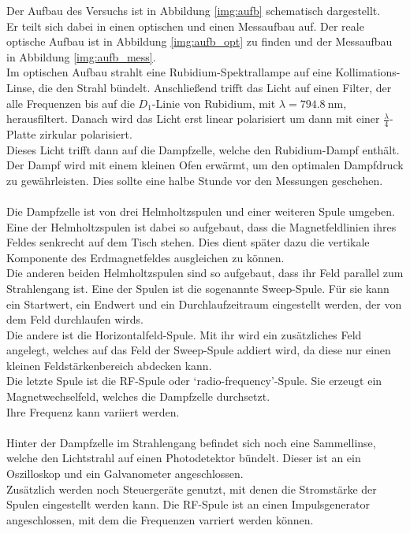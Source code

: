 \noindent
Der Aufbau des Versuchs ist in Abbildung \ref{img:aufb} schematisch dargestellt.\\
Er teilt sich dabei in einen optischen und einen Messaufbau auf. Der reale optische Aufbau ist in Abbildung
\ref{img:aufb_opt} zu finden und der Messaufbau in Abbildung \ref{img:aufb_mess}.\\
Im optischen Aufbau strahlt eine Rubidium-Spektrallampe auf eine Kollimations-Linse, die den Strahl bündelt.
Anschließend trifft das Licht auf einen Filter, der alle Frequenzen bis auf die $D_1$-Linie von Rubidium, 
mit $\lambda = \SI{794.8}{\nano\metre}$, herausfiltert. Danach wird das Licht erst linear polarisiert um dann mit einer $\frac{\lambda}{4}$-Platte zirkular polarisiert.\\
Dieses Licht trifft dann auf die Dampfzelle, welche den Rubidium-Dampf enthält. 
Der Dampf wird mit einem kleinen Ofen erwärmt, um den optimalen Dampfdruck zu gewährleisten.
Dies sollte eine halbe Stunde vor den Messungen geschehen.\\\\
Die Dampfzelle ist von drei Helmholtzspulen und einer weiteren Spule umgeben.\\
Eine der Helmholtzspulen ist dabei so aufgebaut, dass die Magnetfeldlinien ihres Feldes senkrecht auf dem Tisch stehen.
Dies dient später dazu die vertikale Komponente des Erdmagnetfeldes ausgleichen zu können.\\
Die anderen beiden Helmholtzspulen sind so aufgebaut, dass ihr Feld parallel zum Strahlengang ist.
Eine der Spulen ist die sogenannte Sweep-Spule. 
Für sie kann ein Startwert, ein Endwert und ein Durchlaufzeitraum eingestellt werden, der von dem Feld durchlaufen wirds.\\
Die andere ist die Horizontalfeld-Spule. 
Mit ihr wird ein zusätzliches Feld angelegt, welches auf das Feld der Sweep-Spule addiert wird, da diese nur einen kleinen Feldstärkenbereich abdecken kann.\\
Die letzte Spule ist die RF-Spule oder \enquote*{radio-frequency}-Spule. 
Sie erzeugt ein Magnetwechselfeld, welches die Dampfzelle durchsetzt.\\
Ihre Frequenz kann variiert werden.\\\\ 
Hinter der Dampfzelle im Strahlengang befindet sich noch eine Sammellinse, welche den Lichtstrahl auf einen Photodetektor bündelt.
Dieser ist an ein Oszilloskop und ein Galvanometer angeschlossen.\\
Zusätzlich werden noch Steuergeräte genutzt, mit denen die Stromstärke der Spulen eingestellt werden kann.
Die RF-Spule ist an einen Impulsgenerator angeschlossen, mit dem die Frequenzen varriert werden können.\\


